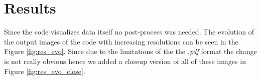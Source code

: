 \documentclass{report}
\begin{document}
\section{Results}
Since the code visualizes data itself no post-process was needed. The evolution of the output images of the code with increasing resolutions can be seen in the Figure \ref{fig:res_evo}. Since due to the limitations of the the \emph{.pdf} format the change is not really obvious hence we added a closeup version of all of these images in Figure \ref{fig:res_evo_close}.
\begin{figure}[H]
\begin{center}

\end{center}
\end{figure}
\end{document}
